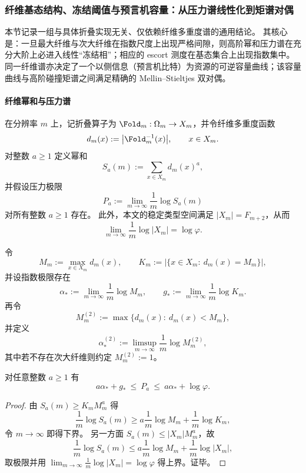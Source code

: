 
\subsubsection{纤维基态结构、冻结阈值与预言机容量：从压力谱线性化到矩谱对偶}\label{subsubsec:fold-fiber-groundstate-freezing-oracle-capacity}
本节记录一组与具体折叠实现无关、仅依赖纤维多重度谱的通用结论。
其核心是：一旦最大纤维与次大纤维在指数尺度上出现严格间隙，则高阶幂和压力谱在充分大阶上必进入线性“冻结相”；相应的 escort 测度在基态集合上出现指数集中。
同一纤维谱亦决定了一个以侧信息（预言机比特）为资源的可逆容量曲线；该容量曲线与高阶碰撞矩谱之间满足精确的 Mellin--Stieltjes 双对偶。

\paragraph{纤维幂和与压力谱}
在分辨率 \(m\) 上，记折叠算子为 \(\Fold_m:\Omega_m\to X_m\)，并令纤维多重度函数
\[
d_m(x):=\bigl|\Fold_m^{-1}(x)\bigr|,
\qquad x\in X_m.
\]
对整数 \(a\ge 1\) 定义幂和
\[
S_a(m):=\sum_{x\in X_m} d_m(x)^a,
\]
并假设压力极限
\[
P_a:=\lim_{m\to\infty}\frac{1}{m}\log S_a(m)
\]
对所有整数 \(a\ge 1\) 存在。
此外，本文的稳定类型空间满足 \(|X_m|=F_{m+2}\)，从而
\[
\lim_{m\to\infty}\frac{1}{m}\log|X_m|=\log\varphi.
\]

令
\[
M_m:=\max_{x\in X_m} d_m(x),
\qquad
K_m:=\bigl|\{x\in X_m:\ d_m(x)=M_m\}\bigr|,
\]
并设指数极限存在
\[
\alpha_*:=\lim_{m\to\infty}\frac{1}{m}\log M_m,
\qquad
g_*:=\lim_{m\to\infty}\frac{1}{m}\log K_m.
\]
再令
\[
M_m^{(2)}:=\max\{d_m(x):\ d_m(x)<M_m\},
\]
并定义
\[
\alpha_*^{(2)}:=\limsup_{m\to\infty}\frac{1}{m}\log M_m^{(2)},
\]
其中若不存在次大纤维则约定 \(M_m^{(2)}:=1\)。

\begin{theorem}[基态下界与全局上界]\label{thm:fold-pressure-groundstate-bounds}
对任意整数 \(a\ge 1\) 有
\[
a\alpha_*+g_*\ \le\ P_a\ \le\ a\alpha_*+\log\varphi.
\]
\end{theorem}

\begin{proof}
由 \(S_a(m)\ge K_m M_m^a\) 得
\[
\frac{1}{m}\log S_a(m)\ge a\frac{1}{m}\log M_m+\frac{1}{m}\log K_m,
\]
令 \(m\to\infty\) 即得下界。
另一方面 \(S_a(m)\le |X_m|M_m^a\)，故
\[
\frac{1}{m}\log S_a(m)\le a\frac{1}{m}\log M_m+\frac{1}{m}\log|X_m|,
\]
取极限并用 \(\lim_{m\to\infty}\frac1m\log|X_m|=\log\varphi\) 得上界。证毕。
\end{proof}

